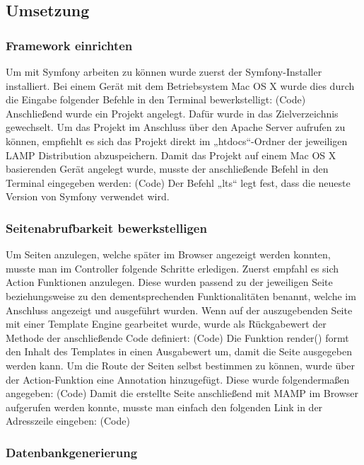  \subsection{Umsetzung}
  
    \subsubsection{Framework einrichten}

Um mit Symfony arbeiten zu können wurde zuerst der Symfony-Installer installiert. Bei einem Gerät mit dem Betriebsystem Mac OS X wurde dies durch die Eingabe folgender Befehle in den Terminal bewerkstelligt:
(Code)
Anschließend wurde ein Projekt angelegt. Dafür wurde in das Zielverzeichnis gewechselt. Um das Projekt im Anschluss über den Apache Server aufrufen zu können, empfiehlt es sich das Projekt direkt im „htdocs“-Ordner der jeweiligen LAMP Distribution abzuspeichern. Damit das Projekt auf einem Mac OS X basierenden Gerät angelegt wurde, musste der anschließende Befehl in den Terminal eingegeben werden:
(Code)
Der Befehl „lts“ legt fest, dass die neueste Version von Symfony verwendet wird.

    \subsubsection{Seitenabrufbarkeit bewerkstelligen}

Um Seiten anzulegen, welche später im Browser angezeigt werden konnten, musste man im Controller folgende Schritte erledigen. Zuerst empfahl es sich Action Funktionen anzulegen. Diese wurden passend zu der jeweiligen Seite beziehungsweise zu den dementsprechenden Funktionalitäten benannt, welche im Anschluss angezeigt und ausgeführt wurden. Wenn auf der auszugebenden Seite mit einer Template Engine gearbeitet wurde, wurde als Rückgabewert der Methode der anschließende Code definiert:
(Code)
Die Funktion render() formt den Inhalt des Templates in einen Ausgabewert um, damit die Seite  ausgegeben werden kann.
Um die Route der Seiten selbst bestimmen zu können, wurde über der Action-Funktion eine Annotation hinzugefügt. Diese wurde folgendermaßen angegeben:
(Code)
Damit die erstellte Seite anschließend mit MAMP im Browser aufgerufen werden konnte, musste man einfach den folgenden Link in der Adresszeile eingeben:
(Code)


    \subsubsection{Datenbankgenerierung}

